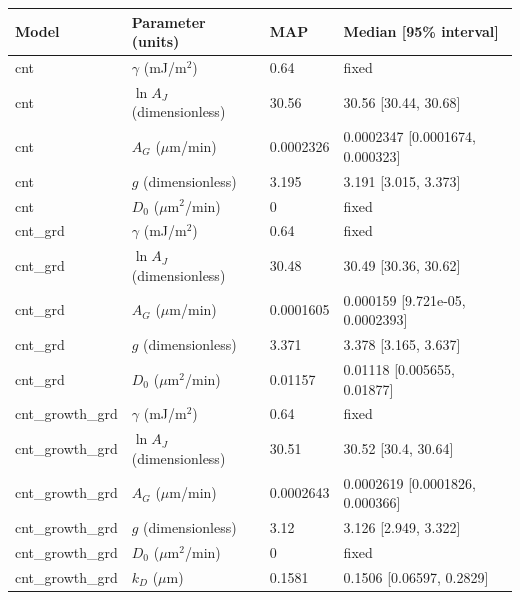 \begin{tabular}{llll}
Model & Parameter (units) & MAP & Median [95\% interval] \\
\hline
cnt & $\gamma$ (mJ/m$^2$) & 0.64 & fixed \\
cnt & $\ln A_J$ (dimensionless) & 30.56 & 30.56 [30.44, 30.68] \\
cnt & $A_G$ ($\mu$m/min) & 0.0002326 & 0.0002347 [0.0001674, 0.000323] \\
cnt & $g$ (dimensionless) & 3.195 & 3.191 [3.015, 3.373] \\
cnt & $D_0$ ($\mu$m$^2$/min) & 0 & fixed \\
cnt\_grd & $\gamma$ (mJ/m$^2$) & 0.64 & fixed \\
cnt\_grd & $\ln A_J$ (dimensionless) & 30.48 & 30.49 [30.36, 30.62] \\
cnt\_grd & $A_G$ ($\mu$m/min) & 0.0001605 & 0.000159 [9.721e-05, 0.0002393] \\
cnt\_grd & $g$ (dimensionless) & 3.371 & 3.378 [3.165, 3.637] \\
cnt\_grd & $D_0$ ($\mu$m$^2$/min) & 0.01157 & 0.01118 [0.005655, 0.01877] \\
cnt\_growth\_grd & $\gamma$ (mJ/m$^2$) & 0.64 & fixed \\
cnt\_growth\_grd & $\ln A_J$ (dimensionless) & 30.51 & 30.52 [30.4, 30.64] \\
cnt\_growth\_grd & $A_G$ ($\mu$m/min) & 0.0002643 & 0.0002619 [0.0001826, 0.000366] \\
cnt\_growth\_grd & $g$ (dimensionless) & 3.12 & 3.126 [2.949, 3.322] \\
cnt\_growth\_grd & $D_0$ ($\mu$m$^2$/min) & 0 & fixed \\
cnt\_growth\_grd & $k_D$ ($\mu$m) & 0.1581 & 0.1506 [0.06597, 0.2829] \\
\end{tabular}
